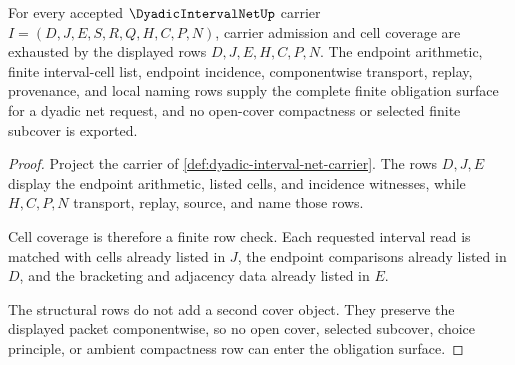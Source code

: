 \begin{theorem}\label{thm:dyadic-interval-net-obligation-surface}
For every accepted $\DyadicIntervalNetUp$ carrier $I=(D,J,E,S,R,Q,H,C,P,N)$, carrier admission and cell coverage are exhausted by the displayed rows $D,J,E,H,C,P,N$. The endpoint arithmetic, finite interval-cell list, endpoint incidence, componentwise transport, replay, provenance, and local naming rows supply the complete finite obligation surface for a dyadic net request, and no open-cover compactness or selected finite subcover is exported.
\end{theorem}
\begin{proof}
Project the carrier of \autoref{def:dyadic-interval-net-carrier}. The rows $D,J,E$ display the endpoint arithmetic, listed cells, and incidence witnesses, while $H,C,P,N$ transport, replay, source, and name those rows.

Cell coverage is therefore a finite row check. Each requested interval read is matched with cells already listed in $J$, the endpoint comparisons already listed in $D$, and the bracketing and adjacency data already listed in $E$.

The structural rows do not add a second cover object. They preserve the displayed packet componentwise, so no open cover, selected subcover, choice principle, or ambient compactness row can enter the obligation surface.
\end{proof}


